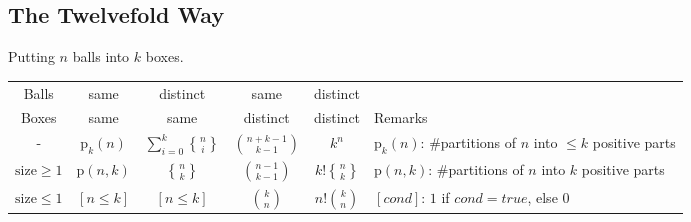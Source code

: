 \documentclass[8pt,a4paper,landscape,oneside]{amsart}
\DeclareRobustCommand{\stirling}{\genfrac\{\}{0pt}{}}
\begin{document}
\begin{multicols*}{3}
    \subsection{The Twelvefold Way}
        Putting $n$ balls into $k$ boxes.\\
    \begin{tabular}{@{}c|c|c|c|c|l@{}}
    Balls & same & distinct & same & distinct & \\
    Boxes & same & same & distinct & distinct & Remarks\\
    \hline
        - & $\mathrm{p}_k(n)$ & $\sum_{i=0}^k \stirling{n}{i}$ & $\binom{n+k-1}{k-1}$ & $k^n$ & $\mathrm{p}_k(n)$: \#partitions of $n$ into $\le k$ positive parts \\
        $\mathrm{size}\ge 1$ & $\mathrm{p}(n,k)$ & $\stirling{n}{k}$ & $\binom{n-1}{k-1}$ & $k!\stirling{n}{k}$ & $\mathrm{p}(n,k)$: \#partitions of $n$ into $k$ positive parts \\
        $\mathrm{size}\le 1$ & $[n \le k]$ & $[n \le k]$ & $\binom{k}{n}$ & $n!\binom{k}{n}$ & $[cond]$: $1$ if $cond=true$, else $0$\\
    \bottomrule
    \end{tabular}

\end{multicols*}
\onecolumn
\end{document}
